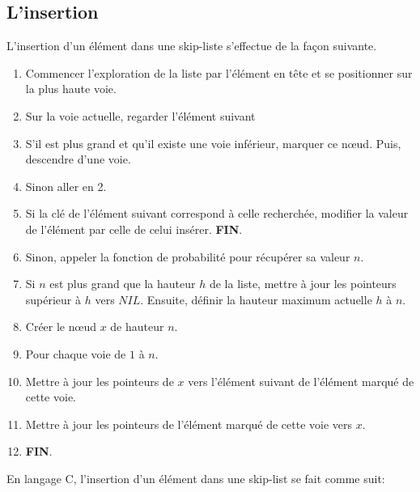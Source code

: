 \documentclass[hidelinks,a4paper, 12pt]{article}
\begin{document}
	\subsection{L'insertion}
	L'insertion d'un élément dans une skip-liste s'effectue de la façon suivante.
	\begin{enumerate}
		\item Commencer l'exploration de la liste par l'élément en tête et se positionner sur la plus haute voie.
		\item Sur la voie actuelle, regarder l'élément suivant
		\item S'il est plus grand et qu'il existe une voie inférieur, marquer ce nœud. Puis, descendre d'une voie.
		\item Sinon aller en 2.
		\item Si la clé de l'élément suivant correspond à celle recherchée, modifier la valeur de l'élément par celle de celui insérer. \textbf{FIN}.
		\item Sinon, appeler la fonction de probabilité pour récupérer sa valeur $n$.
		\item Si $n$ est plus grand que la hauteur $h$ de la liste, mettre à jour les pointeurs supérieur à $h$ vers $NIL$. Ensuite, définir la hauteur maximum actuelle $h$ à $n$.
		\item Créer le nœud $x$ de hauteur $n$.
		\item Pour chaque voie de $1$ à $n$.
		\item Mettre à jour les pointeurs de $x$ vers l'élément suivant de l'élément marqué de cette voie.
		\item Mettre à jour les pointeurs de l'élément marqué de cette voie vers $x$.
		\item \textbf{FIN}.
	\end{enumerate}
	En langage C, l'insertion d'un élément dans une skip-list se fait comme suit:
	
	
\end{document}
